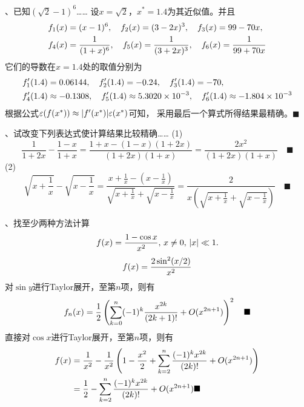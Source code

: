 \par{}、已知$(\sqrt{2}-1)^6$……
\ans
  设$x=\sqrt{2}$，$x^*=1.4$为其近似值。并且
  \[\begin{split}
    \mathnormal{f}_1(x) &= (x-1)^6,\quad
    \mathnormal{f}_2(x) = (3-2x)^3,\quad
    \mathnormal{f}_3(x) = 99-70x, \\
    \mathnormal{f}_4(x) &= \frac{1}{(1+x)^6},\quad
    \mathnormal{f}_5(x) = \frac{1}{(3+2x)^3},\quad
    \mathnormal{f}_6(x) = \frac{1}{99+70x}
  \end{split}\]
  它们的导数在$x=1.4$处的取值分别为
  \[\begin{split}
    &\mathnormal{f}_1^{\prime}(1.4) = 0.06144,\quad
    \mathnormal{f}_2^{\prime}(1.4) = -0.24,\quad
    \mathnormal{f}_3^{\prime}(1.4) = -70,\\
    &\mathnormal{f}_4^{\prime}(1.4) \approx -0.1308,\quad
    \mathnormal{f}_5^{\prime}(1.4) \approx 5.3020 \times 10^{-3},\quad
    \mathnormal{f}_6^{\prime}(1.4) \approx -1.804 \times 10^{-3}
  \end{split}\]
  根据公式$\varepsilon(\mathnormal{f}(x^*)) \approx |\mathnormal{f}^{\prime}(x^*)|\varepsilon(x^*)$可知，
  采用最后一个算式所得结果最精确。$\blacksquare$

\par{}、试改变下列表达式使计算结果比较精确……
\ans
  (1)
  \[
    \frac{1}{1+2x} - \frac{1-x}{1+x} =
    \frac{1+x - (1-x)(1+2x)}{(1+2x)(1+x)} =
    \frac{2x^2}{(1+2x)(1+x)}\quad\blacksquare
  \]
  (2)
  \[
    \sqrt{x+\frac{1}{x}}-\sqrt{x-\frac{1}{x}} =
    \frac{x+\frac{1}{x} - (x-\frac{1}{x})}
    {\sqrt{x+\frac{1}{x}}+\sqrt{x-\frac{1}{x}}}
    = \frac{2}{x
    (\sqrt{x+\frac{1}{x}} + \sqrt{x-\frac{1}{x}})}
    \quad\blacksquare
  \]

\par{}、找至少两种方法计算
  \[
    \mathnormal{f}(x) = \frac{1-\cos x}{x^2},\,x\ne0,\,|x|\ll1.
  \]
\ans
  \[
    \mathnormal{f}(x) = \frac{2\sin^2(x/2)}{x^2}
  \]
  对$\sin y$进行Taylor展开，至第$n$项，则有
  \[
    \mathnormal{f}_n(x) = \frac{1}{2}
    \left(\sum_{k=0}^n (-1)^k\frac{x^{2k}}{(2k+1)!} + O(x^{2n+1})\right)^2
    \quad\blacksquare
  \]
\ans
  直接对$\cos x$进行Taylor展开，至第$n$项，则有
  \[\begin{split}
    \mathnormal{f}(x) &= \frac{1}{x^2} - \frac{1}{x^2}
    \left( 1-\frac{x^2}{2} +
    \sum_{k=2}^n\frac{(-1)^kx^{2k}}{(2k)!} + O(x^{2n+1})
    \right) \\
    &= \frac{1}{2} - \sum_{k=2}^n\frac{(-1)^kx^{2k}}{(2k)!} + O(x^{2n+1})
    \blacksquare
  \end{split}\]

